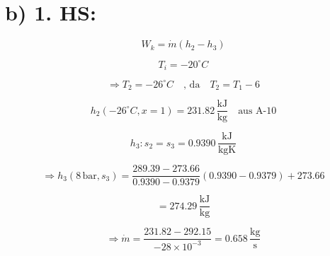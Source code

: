 \section*{b) 1. HS:}

\[
W_k = \dot{m} (h_2 - h_3)
\]

\[
T_i = -20^\circ C
\]

\[
\Rightarrow T_2 = -26^\circ C \quad \text{, da} \quad T_2 = T_1 - 6
\]

\[
h_2 (-26^\circ C, x = 1) = 231.82 \, \frac{\text{kJ}}{\text{kg}} \quad \text{aus A-10}
\]

\[
h_3: s_2 = s_3 = 0.9390 \, \frac{\text{kJ}}{\text{kgK}}
\]

\[
\Rightarrow h_3 (8 \, \text{bar}, s_3) = \frac{289.39 - 273.66}{0.9390 - 0.9379} \left(0.9390 - 0.9379\right) + 273.66
\]

\[
= 274.29 \, \frac{\text{kJ}}{\text{kg}}
\]

\[
\Rightarrow \dot{m} = \frac{231.82 - 292.15}{-28 \times 10^{-3}} = 0.658 \, \frac{\text{kg}}{\text{s}}
\]